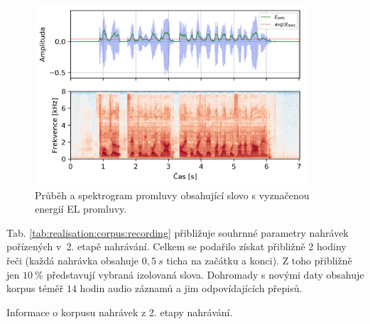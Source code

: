 \begin{figure}[hbpt]
  \centering
  \includegraphics[width=0.9\textwidth]{./ch5-construction/img/energy_spec_sentence.png}
  \caption[Průběh a spektrogram promluvy obsahující slovo .]{Průběh a spektrogram promluvy obsahující slovo  s vyznačenou energií EL promluvy.}
  \label{fig:realisation:corpus:sentence}
\end{figure}

Tab. \ref{tab:realisation:corpus:recording} přibližuje souhrnné parametry nahrávek pořízených v~2. etapě nahrávání.
Celkem se podařilo získat přibližně 2 hodiny řeči (každá nahrávka obsahuje $0,5\ s$ ticha na začátku a konci).
Z toho přibližně jen $10\ \%$ představují vybraná izolovaná slova.
Dohromady s novými daty obsahuje korpus téměř $14$ hodin audio záznamů a jim odpovídajících přepisů.

\begin{table}[htpb]
  \centering
  \def\arraystretch{1.5}
  \caption{Informace o korpusu nahrávek z 2. etapy nahrávání.}
  \label{tab:realisation:corpus:recording}
\end{table}

